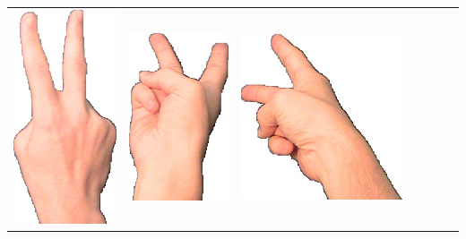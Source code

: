 \documentclass{article}
\begin{document}
\begin{center}
\begin{tabular}{r*{6}{c}}
\includegraphics[scale=0.1]{images/02-01-3.jpg}&
\includegraphics[scale=0.1]{images/02-01-4.jpg}&
\includegraphics[scale=0.1]{images/02-01-5.jpg}&

\end{tabular}
\end{center}
\end{document}
